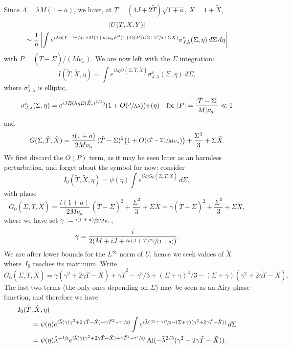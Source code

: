 \documentclass[JEP,XML,SOM,Unicode,NoEqCountersInSection,NoFloatCountersInSection,published]{cedram}
\newcommand{\psfrac}[2]{\sfrac{(#1)}{#2}}
\DeclareMathOperator{\Ai}{Ai}
\theoremstyle{plain}
\theoremstyle{definition}
\begin{document}
Since $\Lambda=\lambda M(1+a)$, we have, at $T=(4J+2\tilde T)\sqrt{1+a}$, $X=1+\tilde X$,
\begin{multline}
\label{eq:71}
|U(T,X,Y)|\\
\sim \frac 1h \left| \int e^{i\lambda\eta (Y-\sfrac{4J}{3}+i M (1+a) \nu_a P^{2}(1+O(P))/2 +\sfrac{\Sigma^{3}}{3}+\Sigma\tilde X)}\sigma^{c}_{J,\lambda}(\Sigma,\eta)\,d\Sigma \,d\eta \right|
\end{multline}
with $P=(\tilde T-\Sigma)/(M\nu_a)$. We are now left with the $\Sigma$ integration:
\begin{equation}
\label{eq:72}
I(\tilde T,\tilde X,\eta)=\int e^{i\lambda \eta G(\Sigma,\tilde T,\tilde X)}\sigma^{c}_{J,\lambda}(\Sigma,\eta)\,d\Sigma,
\end{equation}
where $\sigma^{c}_{J,\lambda}$ is elliptic,
\[
\sigma^{c}_{J,\lambda}(\Sigma,\eta)=e^{iJB(\lambda\eta E(\tilde E_c)^{3/2})}(1+O(\sfrac{J}{\Lambda\lambda}))\psi(\eta)\quad\text{for }|P|=\frac{|\tilde T-\Sigma|}{M|\nu_a|}\ll 1
\]
and
\begin{equation}
\label{eq:73}
G(\Sigma, \tilde T, \tilde X)=\frac{i(1+a)}{2M\nu_a}\, (\tilde T-\Sigma)^{2}\bigl(1+O(\psfrac{\tilde T-\Sigma}{M\nu_a})\bigr) +\frac{\Sigma^{3}}{3}+\Sigma\tilde X.
\end{equation}
We first discard the $O(P)$ term, as it may be seen later as an harmless perturbation, and forget about the symbol for now: consider
\begin{equation}
\label{eq:72bis}
I_{0}(\tilde T,\tilde X,\eta)=\psi(\eta)\int e^{i\lambda \eta G_{0}(\Sigma,\tilde T,\tilde X)}\,d\Sigma,
\end{equation}
with phase
\begin{equation}
\label{eq:73bis}
G_{0}(\Sigma,\tilde T, \tilde X)=\frac{i(1+a)}{2 M \nu_a}\, (\tilde T-\Sigma)^{2}+\frac{\Sigma^{3}}{3}+\Sigma\tilde X=\gamma (\tilde T-\Sigma)^2+\frac{\Sigma^3}{3}+\Sigma \tilde X,
\end{equation}
where we have set $\gamma:= \sfrac{i(1+a)}{2 M \nu_a}$, \ie
\[
\gamma=\frac{i}{2(M+i J+ \sfrac{ia(J+\tilde T/2)}{(1+a)})}.
\]
We are after lower bounds for the $L^{\infty}$ norm of $U$, hence we seek values of $\tilde X$ where~$I_0$ reaches its maximum. Write
\[
G_{0}(\Sigma,\tilde T, \tilde X)=\gamma(\gamma^2+2\gamma \tilde T-\tilde X)+\gamma \tilde T^2-\gamma^3/3+ (\Sigma+\gamma)^3/3-(\Sigma+\gamma)(\gamma^2+2\gamma \tilde T-\tilde X).
\]
The last two terms (the only ones depending on $\Sigma$) may be seen as an Airy phase function, and therefore we have
\begin{equation}\label{Airybound}
\begin{split}
I_0(\tilde T&,\tilde X,\eta)\\
&= \psi(\eta)e^{i\tilde \lambda (\gamma(\gamma^2+2\gamma \tilde T-\tilde X)+\gamma \tilde T^2-\sfrac{\gamma^3}3)}\int e^{i\tilde \lambda (\sfrac{(\Sigma+\gamma)^3}3-(\Sigma+\gamma)(\gamma^2+2\gamma \tilde T-\tilde X))} \,d\Sigma\\
&= \psi(\eta)\tilde\lambda^{-\sfrac 13}e^{i\tilde \lambda (\gamma(\gamma^2+2\gamma \tilde T-\tilde X)+\gamma \tilde T^2-\sfrac {\gamma^3}3)}\Ai(-\tilde\lambda^{2/3}(\gamma^2+2\gamma \tilde T-\tilde X)).
\end{split}
\end{equation}
\end{document}
